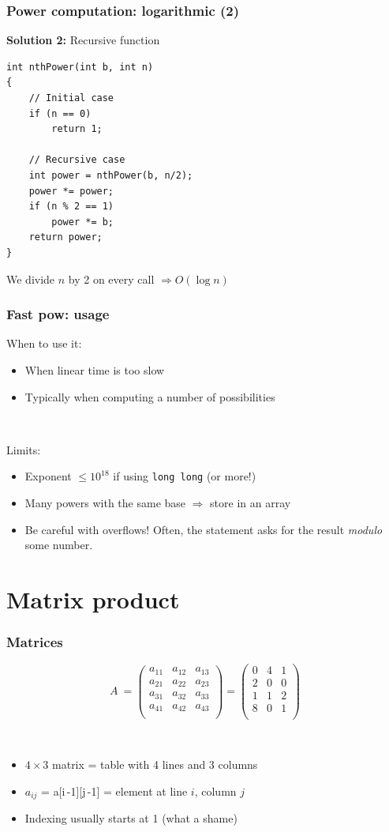 \documentclass[12pt]{beamer}
\begin{document}
\begin{frame}[fragile]
\frametitle{Power computation: logarithmic (2)}
\textbf{Solution 2:} Recursive function
\begin{lstlisting}[frame=single]
int nthPower(int b, int n)
{
    // Initial case
    if (n == 0)
        return 1;
    
    // Recursive case
    int power = nthPower(b, n/2);
    power *= power;
    if (n % 2 == 1)
        power *= b;
    return power;
}
\end{lstlisting}
We divide $n$ by 2 on every call $\Rightarrow O(\log n)$
\end{frame}

\begin{frame}
\frametitle{Fast pow: usage}
When to use it:
\begin{itemize}
\item When linear time is too slow
\item Typically when computing a number of possibilities
\end{itemize}

~

Limits:
\begin{itemize}
\item Exponent $\leq 10^{18}$ if using \texttt{long long} (or more!)
\item Many powers with the same base $\Rightarrow$ store in an array
\item Be careful with overflows! Often, the statement asks for the result \emph{modulo} some number.
\end{itemize}
\end{frame}

\section{Matrix product}

\begin{frame}
\frametitle{Matrices}
\[
A\ =
\left(
\begin{array}{ccc}
a_{11}&a_{12}&a_{13}\\
a_{21}&a_{22}&a_{23}\\
a_{31}&a_{32}&a_{33}\\
a_{41}&a_{42}&a_{43}\\
\end{array}
\right)
=
\left(
\begin{array}{ccc}
0&4&1\\
2&0&0\\
1&1&2\\
8&0&1\\
\end{array}
\right)
\]

~

\begin{itemize}
\item $4 \times 3$ matrix = table with 4 lines and 3 columns
\item $a_{ij}$ = a[i\,-1][j\,-1] = element at line $i$, column $j$
\item Indexing usually starts at 1 (what a shame)
\end{itemize}
\end{frame}
\end{document}
